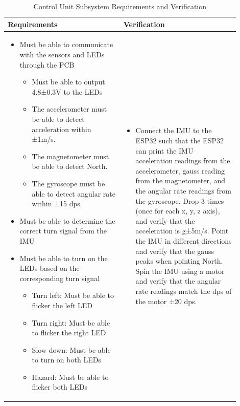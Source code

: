 \documentclass[12pt]{article}
\begin{document}
    \begin{table}[h]
        \centering
        \caption{Control Unit Subsystem Requirements and Verification}
        \begin{tabular}{p{0.45\linewidth}p{0.45\linewidth}}
        \toprule
        \textbf{Requirements} & \textbf{Verification} \\
        \midrule
        \begin{itemize}[leftmargin=*, nosep, after=\strut]
            \item Must be able to communicate with the sensors and LEDs through the PCB
            \begin{itemize}[nosep]
                \item Must be able to output 4.8±0.3V to the LEDs
                \item The accelerometer must be able to detect acceleration within ±1m/s.
                \item The magnetometer must be able to detect North.
                \item The gyroscope must be able to detect angular rate within ±15 dps.
            \end{itemize}
            \item Must be able to determine the correct turn signal from the IMU
            \item Must be able to turn on the LEDs based on the corresponding turn signal
            \begin{itemize}[nosep]
                \item Turn left: Must be able to flicker the left LED
                \item Turn right: Must be able to flicker the right LED
                \item Slow down: Must be able to turn on both LEDs
                \item Hazard: Must be able to flicker both LEDs
            \end{itemize}
        \end{itemize} &
        \begin{itemize}[leftmargin=*, nosep, after=\strut]
            \item Connect the IMU to the ESP32 such that the ESP32 can print the IMU acceleration readings from the accelerometer, gauss reading from the magnetometer, and the angular rate readings from the gyroscope. Drop 3 times (once for each x, y, z axis), and verify that the acceleration is g±5m/s. Point the IMU in different directions and verify that the gauss peaks when pointing North. Spin the IMU using a motor and verify that the angular rate readings match the dps of the motor ±20 dps.

\end{itemize}
\end{tabular}
\end{table}
\end{document}
